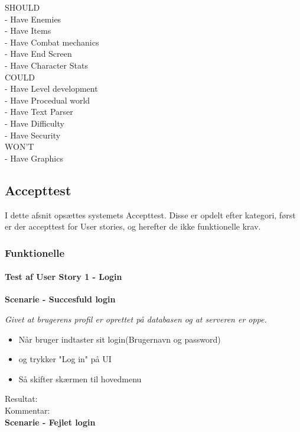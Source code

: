 SHOULD\\
  - Have Enemies\\
  - Have Items\\
  - Have Combat mechanics\\
  - Have End Screen\\
  - Have Character Stats\\

COULD\\
  - Have Level development\\
  - Have Procedual world\\
  - Have Text Parser\\
  - Have Difficulty\\
  - Have Security\\

WON'T\\
  - Have Graphics\\

\subsection{Accepttest}
I dette afsnit opsættes systemets Accepttest. Disse er opdelt efter kategori, først er der accepttest for User stories, og herefter de ikke funktionelle krav.

\subsubsection{Funktionelle}
\paragraph{Test af User Story 1 - Login}

\textbf{Scenarie - Succesfuld login}

\textit{Givet at brugerens profil er oprettet på databasen og at serveren er oppe.}

\begin{itemize}
  \item Når bruger indtaster sit login(Brugernavn og password)
  \item og trykker "Log in" på UI
  \item Så skifter skærmen til hovedmenu
\end{itemize}

Resultat:\\
Kommentar:\\

\textbf{Scenarie - Fejlet login}

